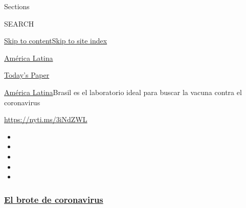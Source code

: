 Sections

SEARCH

\protect\hyperlink{site-content}{Skip to
content}\protect\hyperlink{site-index}{Skip to site index}

\href{https://www.nytimes3xbfgragh.onion/es/section/america-latina}{América
Latina}

\href{https://myaccount.nytimes3xbfgragh.onion/auth/login?response_type=cookie\&client_id=vi}{}

\href{https://www.nytimes3xbfgragh.onion/section/todayspaper}{Today's
Paper}

\href{/es/section/america-latina}{América Latina}\textbar{}Brasil es el
laboratorio ideal para buscar la vacuna contra el coronavirus

\url{https://nyti.ms/3iNdZWL}

\begin{itemize}
\item
\item
\item
\item
\item
\end{itemize}

\hypertarget{el-brote-de-coronavirus}{%
\subsubsection{\texorpdfstring{\href{https://www.nytimes3xbfgragh.onion/es/spotlight/coronavirus?name=styln-coronavirus-es\&region=TOP_BANNER\&variant=undefined\&block=storyline_menu_recirc\&action=click\&pgtype=Article\&impression_id=e3df2a20-e39f-11ea-970e-7dcf3acfc0e1}{El
brote de
coronavirus}}{El brote de coronavirus}}\label{el-brote-de-coronavirus}}


